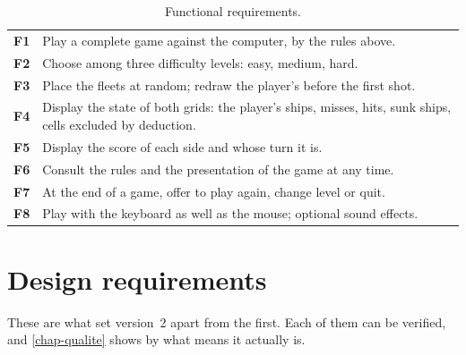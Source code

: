 \begin{table}[ht]
    \centering
    \begin{tabularx}{\textwidth}{@{}lX@{}}
        \toprule
        \textbf{F1} & Play a complete game against the computer, by the rules above.          \\
        \textbf{F2} & Choose among three difficulty levels: easy, medium, hard.               \\
        \textbf{F3} & Place the fleets at random; redraw the player's before the first shot.  \\
        \textbf{F4} & Display the state of both grids: the player's ships, misses, hits, sunk
        ships, cells excluded by deduction.                                                   \\
        \textbf{F5} & Display the score of each side and whose turn it is.                    \\
        \textbf{F6} & Consult the rules and the presentation of the game at any time.         \\
        \textbf{F7} & At the end of a game, offer to play again, change level or quit.        \\
        \textbf{F8} & Play with the keyboard as well as the mouse; optional sound effects.    \\
        \bottomrule
    \end{tabularx}
    \caption{Functional requirements.}
    \label{tab-fonctionnelles}
\end{table}

\section{Design requirements}

These are what set version~2 apart from the first. Each of them can be verified, and
\cref{chap-qualite} shows by what means it actually is.

